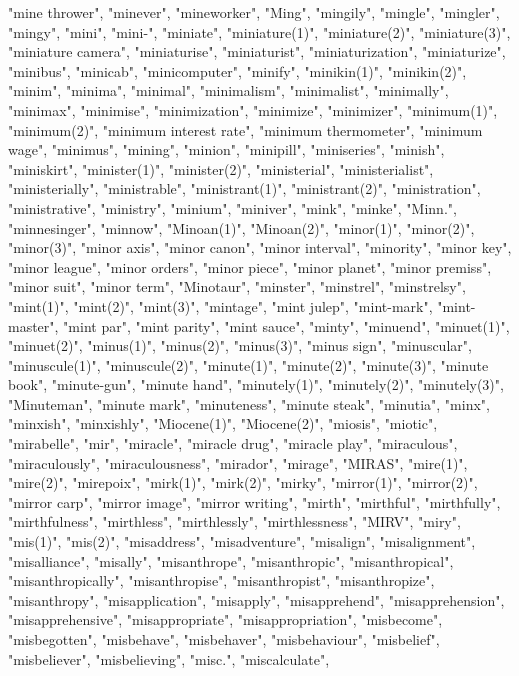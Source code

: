 "mine thrower",
"minever",
"mineworker",
"Ming",
"mingily",
"mingle",
"mingler",
"mingy",
"mini",
"mini-",
"miniate",
"miniature(1)",
"miniature(2)",
"miniature(3)",
"miniature camera",
"miniaturise",
"miniaturist",
"miniaturization",
"miniaturize",
"minibus",
"minicab",
"minicomputer",
"minify",
"minikin(1)",
"minikin(2)",
"minim",
"minima",
"minimal",
"minimalism",
"minimalist",
"minimally",
"minimax",
"minimise",
"minimization",
"minimize",
"minimizer",
"minimum(1)",
"minimum(2)",
"minimum interest rate",
"minimum thermometer",
"minimum wage",
"minimus",
"mining",
"minion",
"minipill",
"miniseries",
"minish",
"miniskirt",
"minister(1)",
"minister(2)",
"ministerial",
"ministerialist",
"ministerially",
"ministrable",
"ministrant(1)",
"ministrant(2)",
"ministration",
"ministrative",
"ministry",
"minium",
"miniver",
"mink",
"minke",
"Minn.",
"minnesinger",
"minnow",
"Minoan(1)",
"Minoan(2)",
"minor(1)",
"minor(2)",
"minor(3)",
"minor axis",
"minor canon",
"minor interval",
"minority",
"minor key",
"minor league",
"minor orders",
"minor piece",
"minor planet",
"minor premiss",
"minor suit",
"minor term",
"Minotaur",
"minster",
"minstrel",
"minstrelsy",
"mint(1)",
"mint(2)",
"mint(3)",
"mintage",
"mint julep",
"mint-mark",
"mint-master",
"mint par",
"mint parity",
"mint sauce",
"minty",
"minuend",
"minuet(1)",
"minuet(2)",
"minus(1)",
"minus(2)",
"minus(3)",
"minus sign",
"minuscular",
"minuscule(1)",
"minuscule(2)",
"minute(1)",
"minute(2)",
"minute(3)",
"minute book",
"minute-gun",
"minute hand",
"minutely(1)",
"minutely(2)",
"minutely(3)",
"Minuteman",
"minute mark",
"minuteness",
"minute steak",
"minutia",
"minx",
"minxish",
"minxishly",
"Miocene(1)",
"Miocene(2)",
"miosis",
"miotic",
"mirabelle",
"mir",
"miracle",
"miracle drug",
"miracle play",
"miraculous",
"miraculously",
"miraculousness",
"mirador",
"mirage",
"MIRAS",
"mire(1)",
"mire(2)",
"mirepoix",
"mirk(1)",
"mirk(2)",
"mirky",
"mirror(1)",
"mirror(2)",
"mirror carp",
"mirror image",
"mirror writing",
"mirth",
"mirthful",
"mirthfully",
"mirthfulness",
"mirthless",
"mirthlessly",
"mirthlessness",
"MIRV",
"miry",
"mis(1)",
"mis(2)",
"misaddress",
"misadventure",
"misalign",
"misalignment",
"misalliance",
"misally",
"misanthrope",
"misanthropic",
"misanthropical",
"misanthropically",
"misanthropise",
"misanthropist",
"misanthropize",
"misanthropy",
"misapplication",
"misapply",
"misapprehend",
"misapprehension",
"misapprehensive",
"misappropriate",
"misappropriation",
"misbecome",
"misbegotten",
"misbehave",
"misbehaver",
"misbehaviour",
"misbelief",
"misbeliever",
"misbelieving",
"misc.",
"miscalculate",
